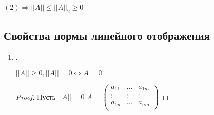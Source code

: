 \documentclass[main]{subfiles}
\begin{document}
$(2) \Rightarrow ||A|| \leq ||A||_2 \geq 0$

\subsection*{Свойства нормы линейного отображения}
\begin{enumerate}
    \item . \begin{theorem}$||A|| \geq 0, ||A|| = 0 \Leftrightarrow A = \mathbb{0}$ \end{theorem}
    \begin{proof}
        Пусть $||A|| = 0$ 
        $A = \begin{pmatrix}
            a_{11} & \ldots & a_{1m} \\
            \vdots & \vdots & \vdots \\
            a_{1n} & \ldots & a_{nm} \\
        \end{pmatrix}$
        

\end{proof}
\end{enumerate}
\end{document}
